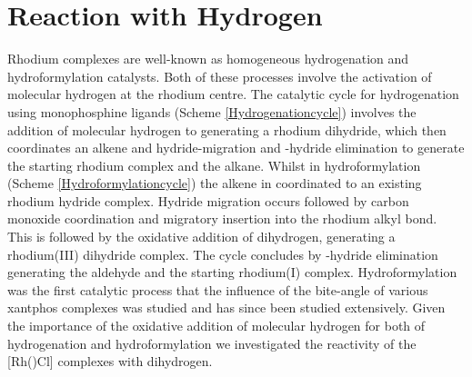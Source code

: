 \section{Reaction with Hydrogen}
\label{section:rhodiumhydride}

Rhodium complexes are well-known as homogeneous hydrogenation and hydroformylation catalysts.  Both of these processes involve the activation of molecular hydrogen at the rhodium centre.  The catalytic cycle for hydrogenation using monophosphine ligands (Scheme \ref{Hydrogenationcycle}) involves the addition of molecular hydrogen to \ce{[Rh(PR3)2Cl]} generating a rhodium dihydride, which then coordinates an alkene and hydride-migration and \chembeta-hydride elimination to generate the starting rhodium complex and the alkane.  Whilst in hydroformylation (Scheme \ref{Hydroformylationcycle}) the alkene in coordinated to an existing rhodium hydride complex.  Hydride migration occurs followed by carbon monoxide coordination and migratory insertion into the rhodium alkyl bond.  This is followed by the oxidative addition of dihydrogen, generating a rhodium(III) dihydride complex.  The cycle concludes by \chembeta-hydride elimination generating the aldehyde and the starting rhodium(I) complex.  Hydroformylation was the first catalytic process that the influence of the bite-angle of various xantphos complexes was studied\cite{Kranenburg1995} and has since been studied extensively.  Given the importance of the oxidative addition of molecular hydrogen for both of hydrogenation and hydroformylation we investigated the reactivity of the [Rh(\tBuxantphosk)Cl] complexes with dihydrogen.  

